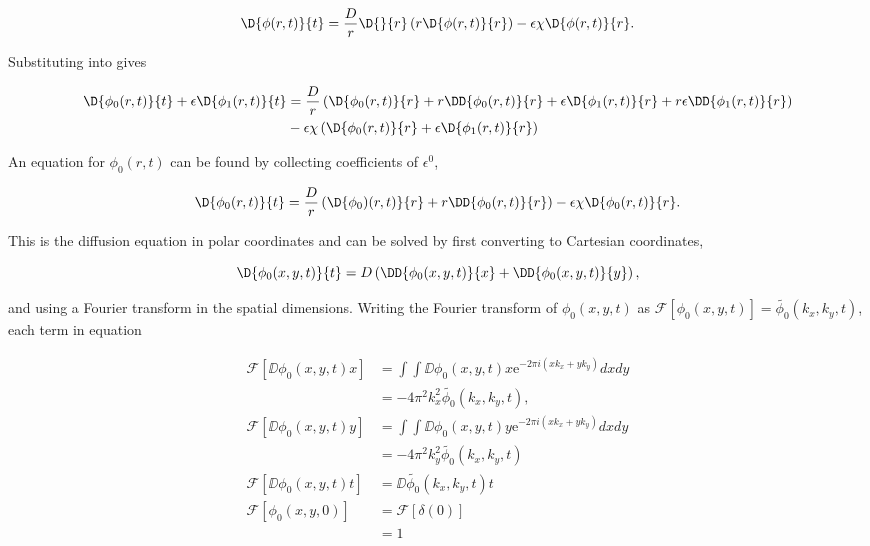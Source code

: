 \begin{equation}
  \D{\phi(r,t)}{t} = \frac{D}{r} \D{}{r}\left(r \D{\phi(r,t)}{r} \right) - \epsilon\chi \D{\phi(r,t)}{r}.
  \label{eqn:convection_perturbation}
\end{equation}

Substituting  into  gives

\begin{equation}
\begin{split}
  \D{\phi_0(r,t)}{t} + \epsilon\D{\phi_1(r,t)}{t} &= \frac{D}{r} \left( \D{\phi_0(r,t)}{r} + r \DD{\phi_0(r,t)}{r} + \epsilon\D{\phi_1(r,t)}{r} + r\epsilon \DD{\phi_1(r,t)}{r}\right)  \\
  &- \epsilon\chi \left( \D{\phi_0(r,t)}{r} + \epsilon \D{\phi_1(r,t)}{r} \right)
  \end{split}
\end{equation}

An equation for $\phi_0(r,t)$ can be found by collecting coefficients of $\epsilon^0$,

\begin{equation}
  \D{\phi_0(r,t)}{t} = \frac{D}{r} \left(\D{\phi_0)(r,t)}{r} + r\DD{\phi_0(r,t)}{r}\right) - \epsilon\chi \D{\phi_0(r,t)}{r}.
  \label{eqn:diffusion_eps0}
\end{equation}

This is the diffusion equation in polar coordinates and can be solved by first converting to Cartesian coordinates,

\begin{equation}
  \D{\phi_0(x,y,t)}{t} = D \left( \DD{\phi_0(x,y,t)}{x}+\DD{\phi_0(x,y,t)}{y}\right),
  \label{eqn:cartesian_diffusion}
\end{equation}

and using a Fourier transform in the spatial dimensions. Writing the Fourier transform of $\phi_0(x,y,t)$ as $\mathscr{F}\left[ \phi_0(x,y,t) \right] = \tilde{\phi_0}(k_x,k_y,t)$, each term in equation

\begin{equation}
\begin{split}
  \mathscr{F}\left[ \DD{\phi_0(x,y,t)}{x} \right] &= \int \int \DD{\phi_0(x,y,t)}{x} \mathrm{e}^{-2\pi i(xk_x + yk_y)} dx dy \\
  &= -4\pi^2k_x^2 \tilde{\phi_0}(k_x,k_y,t), \\
  \mathscr{F}\left[ \DD{\phi_0(x,y,t)}{y} \right] &= \int \int \DD{\phi_0(x,y,t)}{y} \mathrm{e}^{-2\pi i(xk_x + yk_y)} dx dy \\
  &= -4\pi^2k_y^2 \tilde{\phi_0}(k_x,k_y,t) \\
  \mathscr{F}\left[\DD{\phi_0(x,y,t)}{t}\right] &= \DD{\tilde{\phi_0}(k_x,k_y,t)}{t} \\
  \mathscr{F}\left[\phi_0(x,y,0)\right] &= \mathscr{F}\left[\delta(0)\right] \\
  &= 1
\end{split}
\end{equation}


